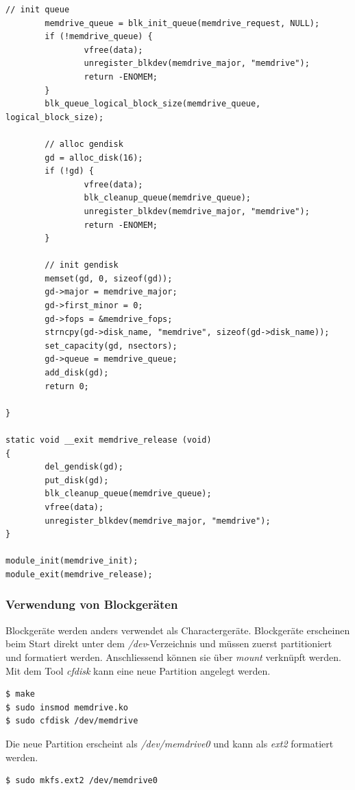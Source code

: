 \begin{lstlisting}[label=lst:block_driver,caption=Block Driver]
        // init queue
        memdrive_queue = blk_init_queue(memdrive_request, NULL);
        if (!memdrive_queue) {
                vfree(data);
                unregister_blkdev(memdrive_major, "memdrive");
                return -ENOMEM;
        }
        blk_queue_logical_block_size(memdrive_queue, logical_block_size);      

        // alloc gendisk
        gd = alloc_disk(16);
        if (!gd) {
                vfree(data);
                blk_cleanup_queue(memdrive_queue);
                unregister_blkdev(memdrive_major, "memdrive");
                return -ENOMEM;
        }

        // init gendisk
        memset(gd, 0, sizeof(gd));
        gd->major = memdrive_major;
        gd->first_minor = 0;
        gd->fops = &memdrive_fops;
        strncpy(gd->disk_name, "memdrive", sizeof(gd->disk_name));
        set_capacity(gd, nsectors);
        gd->queue = memdrive_queue;
        add_disk(gd);
        return 0;

}

static void __exit memdrive_release (void)
{
        del_gendisk(gd);
        put_disk(gd);
        blk_cleanup_queue(memdrive_queue);
        vfree(data);
        unregister_blkdev(memdrive_major, "memdrive");
}

module_init(memdrive_init);
module_exit(memdrive_release);
\end{lstlisting}


\subsubsection{Verwendung von Blockgeräten}

Blockgeräte werden anders verwendet als Charactergeräte. Blockgeräte erscheinen beim Start direkt unter dem \emph{/dev}-Verzeichnis und müssen
zuerst partitioniert und formatiert werden. Anschliessend können sie über \emph{mount} verknüpft werden. \\

Mit dem Tool \emph{cfdisk} kann eine neue Partition angelegt werden.
\begin{lstlisting}
$ make
$ sudo insmod memdrive.ko
$ sudo cfdisk /dev/memdrive
\end{lstlisting}

Die neue Partition erscheint als \emph{/dev/memdrive0} und kann als \emph{ext2} formatiert werden.
\begin{lstlisting}
$ sudo mkfs.ext2 /dev/memdrive0
\end{lstlisting}

